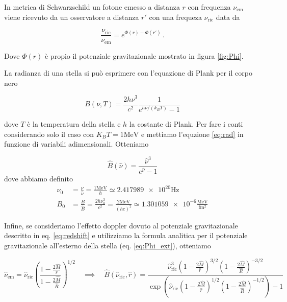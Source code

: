 \documentclass[a4paper, titlepage]{article}
\newcommand{\Sh}[0]{Schwarzschild }
\begin{document}
In metrica di \Sh un fotone emesso a distanza $r$ con frequenza $\nu_\text{em}$ viene ricevuto da un osservatore a distanza $r'$ con una frequeza $\nu_\text{ric}$ data da

\begin{equation}
    \frac{\nu_\text{ric}}{\nu_\text{em}} = e^{\Phi (r) - \Phi (r')} \, .
\label{eq:redshift}
\end{equation}

Dove $\Phi (r)$ è propio il potenziale gravitazionale mostrato in figura \ref{fig:Phi}.

La radianza di una stella si può esprimere con l'equazione di Plank per il corpo nero

\begin{equation}
    B(\nu, T) = \frac{2 h \nu ^3}{c^2} \frac{1}{e^{h \nu / (k_B T)} - 1}
    \label{eq:rad}
\end{equation}

dove $T$ è la temperatura della stella e $h$ la costante di Plank.
Per fare i conti considerando solo il caso con $K_B T = 1 \unit{\mega\electronvolt}$ e mettiamo l'equzione \ref{eq:rad} in funzione di variabili adimensionali. Otteniamo

\begin{equation}
    \hat B(\hat \nu) = \frac{\hat \nu ^3 }{e^{\hat \nu} - 1}
    \label{eq:B_ad}
\end{equation}
dove abbiamo definito
\begin{align*}
    \nu_0 &= \frac{\nu}{\hat \nu} = \frac{1\unit{\mega\electronvolt}}{h} \simeq \num{2.417989e20} \unit{\hertz} \\
    B_0 &= \frac{B}{\hat B} = \frac{2 h \nu_0^3}{c^2} = \frac{2 \unit{\mega\electronvolt}}{(h c)^2} \simeq \num{1.301059e-6} \frac{\unit{\mega\electronvolt}}{\unit{\femto\meter\squared}}
\end{align*}

Infine, se consideriamo l'effetto doppler dovuto al potenziale gravitazionale descritto in eq. \ref{eq:redshift} e utilizziamo la formula analitica per il potenziale gravitazionale all'esterno della stella (eq. \ref{eq:Phi_ext}), otteniamo

\begin{equation}
    \hat \nu_\text{em} = \hat \nu_\text{ric} \left ( \frac{1 - \frac{2 \hat M}{r}}{1 - \frac{2 \hat M}{\hat R}}\right )^{1/2}
    \quad
    \implies
    \quad
    \hat B(\hat \nu_\text{ric}, \hat r) =
    \frac{\hat \nu_\text{ric}^3 \left(1 - \frac{2 \hat M}{\hat r}\right)^{3/2} \left(1 - \frac{2 \hat M}{\hat R}\right)^{-3/2} }
    {\exp( \hat \nu_\text{ric} \left(1 - \frac{2 \hat M}{\hat r} \right)^{1/2} \left(1 - \frac{2 \hat M}{\hat R}\right)^{-1/2} ) - 1}
    \label{eq:B_corr}
\end{equation}
\end{document}
